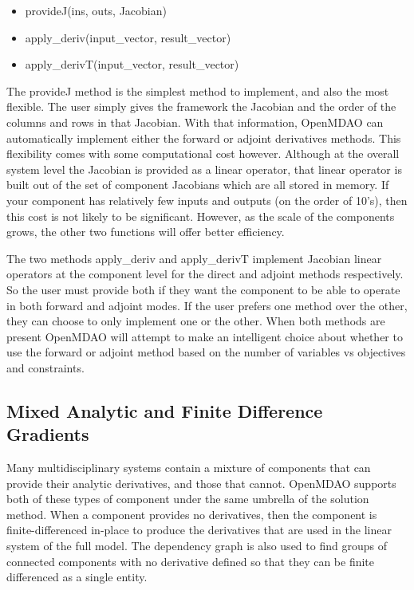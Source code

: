 \documentclass[]{aiaa-tc} %
\begin{document}
    \begin{itemize}
        \item provideJ(ins, outs, Jacobian)
        \item apply_deriv(input_vector, result_vector)
        \item apply_derivT(input_vector, result_vector)
    \end{itemize}
    
    The provideJ method is the simplest method to implement, and also the most flexible. The user simply gives the framework the 
    Jacobian and the order of the columns and rows in that Jacobian. With that information, OpenMDAO can automatically 
    implement either the forward or adjoint derivatives methods. This flexibility comes with some computational cost however. 
    Although at the overall system level the Jacobian is provided as a linear operator, that linear operator is built out 
    of the set of component Jacobians which are all stored in memory. If your component has relatively few inputs and outputs 
    (on the order of 10's), then this cost is not likely to be significant. However, as the scale of the components grows, 
    the other two functions will offer better efficiency. 

    The two methods apply_deriv and apply_derivT implement Jacobian linear operators at 
    the component level for the direct and adjoint methods respectively. So the user must provide both if they 
    want the component to be able to operate in both forward and adjoint modes. If the user prefers one method over 
    the other, they can choose to only implement one or the other. When both methods are present OpenMDAO will 
    attempt to make an intelligent choice about whether to use the forward or adjoint method based on the number 
    of variables vs objectives and constraints. 
    
    \subsection{Mixed Analytic and Finite Difference Gradients}
    
    Many multidisciplinary systems contain a mixture of components that can provide their analytic derivatives, and
    those that cannot. OpenMDAO supports both of these types of component under the same umbrella of the
    solution method. When a component provides no derivatives, then the component is finite-differenced in-place to
    produce the derivatives that are used in the linear system of the full model. The dependency graph is also used
    to find groups of connected components with no derivative defined so that they can be finite differenced as a single entity. 
    
\end{document}
